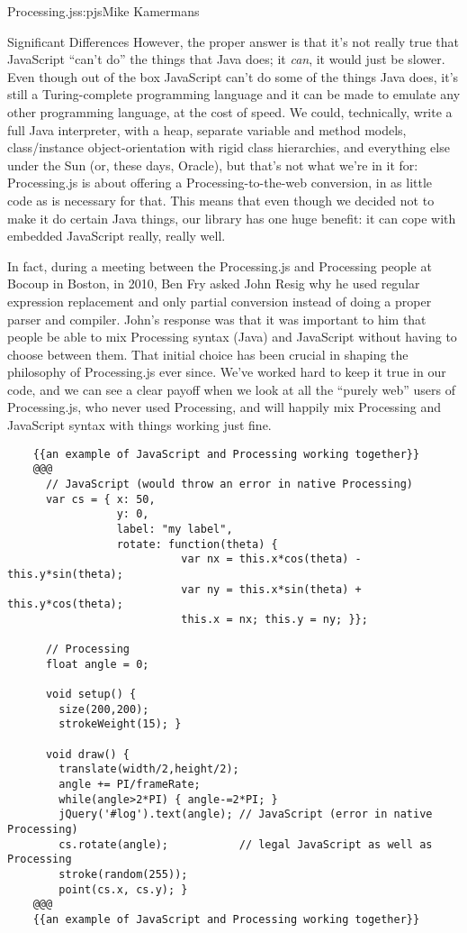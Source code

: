 \begin{aosachapter}{Processing.js}{s:pjs}{Mike Kamermans}
\begin{aosasect1}{Significant Differences}
However, the proper answer is that it's not really true that
JavaScript ``can't do'' the things that Java does; it \emph{can}, it would
just be slower. Even though out of the box JavaScript can't do some of
the things Java does, it's still a Turing-complete programming
language and it can be made to emulate any other programming language,
at the cost of speed. We could, technically, write a full Java
interpreter, with a  heap, separate variable and method models,
class/instance object-orientation with rigid class hierarchies,
and everything else under the Sun (or, these days, Oracle), but that's
not what we're in it for: Processing.js is about offering a
Processing-to-the-web conversion, in as little code as is necessary
for that. This means that even though we decided not to make it do
certain Java things, our library has one huge benefit: it can cope
with embedded JavaScript really, really well.

In fact, during a meeting between the Processing.js and Processing
people at Bocoup in Boston, in 2010, Ben Fry asked John Resig why he
used regular expression replacement and only partial conversion
instead of doing a proper parser and compiler. John's response was
that it was important to him that people be able to mix Processing
syntax (Java) and JavaScript without having to choose between
them. That initial choice has been crucial in shaping the philosophy
of Processing.js ever since. We've worked hard to keep it true in our
code, and we can see a clear payoff when we look at all the ``purely
web'' users of Processing.js, who never used Processing, and will
happily mix Processing and JavaScript syntax with things working just
fine.

\begin{verbatim}
    {{an example of JavaScript and Processing working together}}
    @@@
      // JavaScript (would throw an error in native Processing)
      var cs = { x: 50,
                 y: 0,
                 label: "my label",
                 rotate: function(theta) {
                           var nx = this.x*cos(theta) - this.y*sin(theta);
                           var ny = this.x*sin(theta) + this.y*cos(theta);
                           this.x = nx; this.y = ny; }};

      // Processing
      float angle = 0;

      void setup() {
        size(200,200);
        strokeWeight(15); }

      void draw() {
        translate(width/2,height/2);
        angle += PI/frameRate;
        while(angle>2*PI) { angle-=2*PI; }
        jQuery('#log').text(angle); // JavaScript (error in native Processing)
        cs.rotate(angle);           // legal JavaScript as well as Processing
        stroke(random(255));
        point(cs.x, cs.y); }
    @@@
    {{an example of JavaScript and Processing working together}}
\end{verbatim}


\end{aosasect1}
\end{aosachapter}

